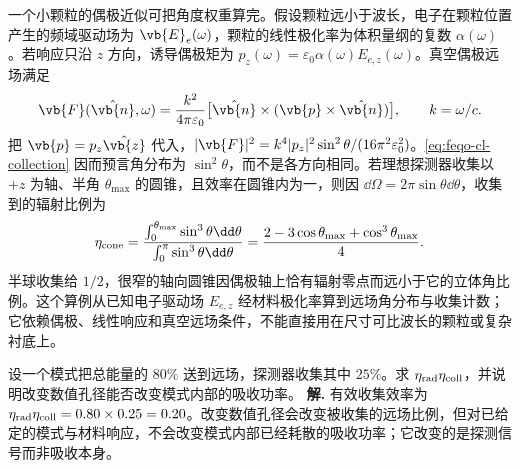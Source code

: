 一个小颗粒的偶极近似可把角度权重算完。假设颗粒远小于波长，电子在颗粒位置产生的频域驱动场为 \(\vb{E}_e(\omega)\)，颗粒的线性极化率为体积量纲的复数 \(\alpha(\omega)\)。若响应只沿 \(z\) 方向，诱导偶极矩为 \(p_z(\omega)=\varepsilon_0\alpha(\omega)E_{e,z}(\omega)\)。真空偶极远场满足
\[
\vb{F}(\hat{\vb{n}},\omega)
=\frac{k^2}{4\pi\varepsilon_0}
\bigl[\hat{\vb{n}}\times(\vb{p}\times\hat{\vb{n}})\bigr],
\qquad k=\omega/c.
\]
把 \(\vb{p}=p_z\hat{\vb{z}}\) 代入，\(|\vb{F}|^2=k^4|p_z|^2\sin^2\theta/(16\pi^2\varepsilon_0^2)\)。\cref{eq:feqo-cl-collection} 因而预言角分布为 \(\sin^2\theta\)，而不是各方向相同。若理想探测器收集以 \(+z\) 为轴、半角 \(\theta_{\max}\) 的圆锥，且效率在圆锥内为一，则因 \(\dd\Omega=2\pi\sin\theta\dd\theta\)，收集到的辐射比例为
\begin{equation}
\eta_{\rm cone}=
\frac{\int_0^{\theta_{\max}}\sin^3\theta\dd\theta}
{\int_0^\pi\sin^3\theta\dd\theta}
=\frac{2-3\cos\theta_{\max}+\cos^3\theta_{\max}}4.
\label{eq:feqo-dipole-collection-fraction}
\end{equation}
半球收集给 \(1/2\)，很窄的轴向圆锥因偶极轴上恰有辐射零点而远小于它的立体角比例。这个算例从已知电子驱动场 \(E_{e,z}\) 经材料极化率算到远场角分布与收集计数；它依赖偶极、线性响应和真空远场条件，不能直接用在尺寸可比波长的颗粒或复杂衬底上。



\par
\begin{workedexample}
设一个模式把总能量的 \(80\%\) 送到远场，探测器收集其中 \(25\%\)。求 \(\eta_{\rm rad}\eta_{\rm coll}\)，并说明改变数值孔径能否改变模式内部的吸收功率。
\textbf{解.} 有效收集效率为 \(\eta_{\rm rad}\eta_{\rm coll}=0.80\times0.25=0.20\)。改变数值孔径会改变被收集的远场比例，但对已给定的模式与材料响应，不会改变模式内部已经耗散的吸收功率；它改变的是探测信号而非吸收本身。
\end{workedexample}
\par

